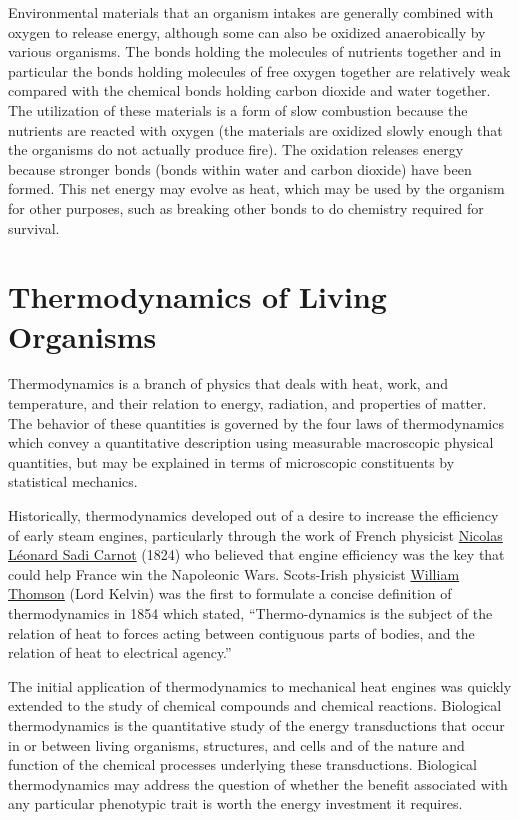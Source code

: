 Environmental materials that an organism intakes are generally combined with oxygen to release energy, although some can also be oxidized anaerobically by various organisms. The bonds holding the molecules of nutrients together and in particular the bonds holding molecules of free oxygen together are relatively weak compared with the chemical bonds holding carbon dioxide and water together. The utilization of these materials is a form of slow combustion because the nutrients are reacted with oxygen (the materials are oxidized slowly enough that the organisms do not actually produce fire). The oxidation releases energy because stronger bonds (bonds within water and carbon dioxide) have been formed. This net energy may evolve as heat, which may be used by the organism for other purposes, such as breaking other bonds to do chemistry required for survival.

\hypertarget{thermodynamics-of-living-organisms}{%
\section{Thermodynamics of Living Organisms}\label{thermodynamics-of-living-organisms}}

Thermodynamics is a branch of physics that deals with heat, work, and temperature, and their relation to energy, radiation, and properties of matter. The behavior of these quantities is governed by the four laws of thermodynamics which convey a quantitative description using measurable macroscopic physical quantities, but may be explained in terms of microscopic constituents by statistical mechanics.

Historically, thermodynamics developed out of a desire to increase the efficiency of early steam engines, particularly through the work of French physicist \href{https://en.wikipedia.org/wiki/Nicolas_Léonard_Sadi_Carnot}{Nicolas Léonard Sadi Carnot} (1824) who believed that engine efficiency was the key that could help France win the Napoleonic Wars. Scots-Irish physicist \href{https://en.wikipedia.org/wiki/William_Thomson,_1st_Baron_Kelvin}{William Thomson} (Lord Kelvin) was the first to formulate a concise definition of thermodynamics in 1854 which stated, ``Thermo-dynamics is the subject of the relation of heat to forces acting between contiguous parts of bodies, and the relation of heat to electrical agency.''

The initial application of thermodynamics to mechanical heat engines was quickly extended to the study of chemical compounds and chemical reactions. Biological thermodynamics is the quantitative study of the energy transductions that occur in or between living organisms, structures, and cells and of the nature and function of the chemical processes underlying these transductions. Biological thermodynamics may address the question of whether the benefit associated with any particular phenotypic trait is worth the energy investment it requires.

